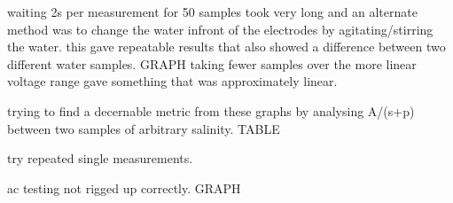 waiting 2s per measurement for 50 samples took very long and an alternate method was to change the water infront of the electrodes by agitating/stirring the water.
this gave repeatable results that also showed a difference between two different water samples. GRAPH
taking fewer samples over the more linear voltage range gave something that was approximately linear.

trying to find a decernable metric from these graphs by analysing A/(s+p) between two samples of arbitrary salinity. TABLE

try repeated single measurements.

ac testing not rigged up correctly. GRAPH